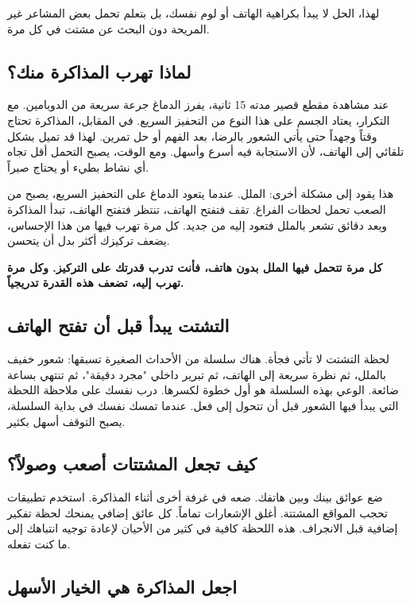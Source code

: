 \documentclass[12pt,a4paper]{book}
\newcommand{\importantAr}[1]{%
	\begin{important}
		\bfseries #1
	\end{important}
}
\begin{document}
لهذا، الحل لا يبدأ بكراهية الهاتف أو لوم نفسك، بل بتعلم تحمل بعض المشاعر غير المريحة دون البحث عن مشتت في كل مرة.

\subsection{لماذا تهرب المذاكرة منك؟}

عند مشاهدة مقطع قصير مدته 15 ثانية، يفرز الدماغ جرعة سريعة من الدوبامين. مع التكرار، يعتاد الجسم على هذا النوع من التحفيز السريع. في المقابل، المذاكرة تحتاج وقتاً وجهداً حتى يأتي الشعور بالرضا، بعد الفهم أو حل تمرين. لهذا قد تميل بشكل تلقائي إلى الهاتف، لأن الاستجابة فيه أسرع وأسهل. ومع الوقت، يصبح التحمل أقل تجاه أي نشاط بطيء أو يحتاج صبراً.

هذا يقود إلى مشكلة أخرى: الملل. عندما يتعود الدماغ على التحفيز السريع، يصبح من الصعب تحمل لحظات الفراغ. تقف فتفتح الهاتف، تنتظر فتفتح الهاتف، تبدأ المذاكرة وبعد دقائق تشعر بالملل فتعود إليه من جديد. كل مرة تهرب فيها من هذا الإحساس، يضعف تركيزك أكثر بدل أن يتحسن.

\importantAr{كل مرة تتحمل فيها الملل بدون هاتف، فأنت تدرب قدرتك على التركيز. وكل مرة تهرب إليه، تضعف هذه القدرة تدريجياً.}

\subsection{التشتت يبدأ قبل أن تفتح الهاتف}

لحظة التشتت لا تأتي فجأة. هناك سلسلة من الأحداث الصغيرة تسبقها: شعور خفيف بالملل، ثم نظرة سريعة إلى الهاتف، ثم تبرير داخلي "مجرد دقيقة"، ثم تنتهي بساعة ضائعة. الوعي بهذه السلسلة هو أول خطوة لكسرها. درب نفسك على ملاحظة اللحظة التي يبدأ فيها الشعور قبل أن تتحول إلى فعل. عندما تمسك نفسك في بداية السلسلة، يصبح التوقف أسهل بكثير.

\subsection{كيف تجعل المشتتات أصعب وصولاً؟}

ضع عوائق بينك وبين هاتفك. ضعه في غرفة أخرى أثناء المذاكرة. استخدم تطبيقات تحجب المواقع المشتتة. أغلق الإشعارات تماماً. كل عائق إضافي يمنحك لحظة تفكير إضافية قبل الانجراف. هذه اللحظة كافية في كثير من الأحيان لإعادة توجيه انتباهك إلى ما كنت تفعله.

\subsection{اجعل المذاكرة هي الخيار الأسهل}
\end{document}
